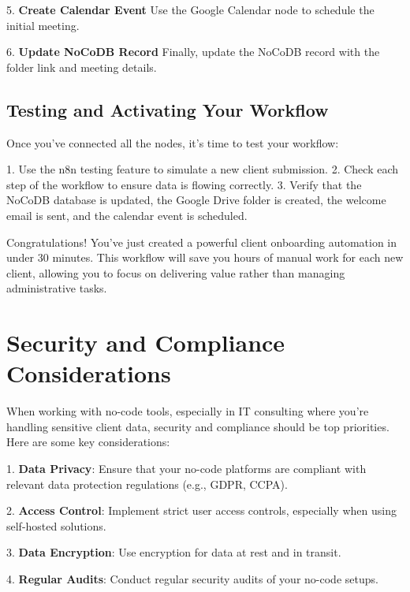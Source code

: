 5. \textbf{Create Calendar Event}
Use the Google Calendar node to schedule the initial meeting.


6. \textbf{Update NoCoDB Record}
Finally, update the NoCoDB record with the folder link and meeting details.


\subsection{Testing and Activating Your Workflow}

Once you've connected all the nodes, it's time to test your workflow:

1. Use the n8n testing feature to simulate a new client submission.
2. Check each step of the workflow to ensure data is flowing correctly.
3. Verify that the NoCoDB database is updated, the Google Drive folder is created, the welcome email is sent, and the calendar event is scheduled.


Congratulations! You've just created a powerful client onboarding automation in under 30 minutes. This workflow will save you hours of manual work for each new client, allowing you to focus on delivering value rather than managing administrative tasks.

\section{Security and Compliance Considerations}

When working with no-code tools, especially in IT consulting where you're handling sensitive client data, security and compliance should be top priorities. Here are some key considerations:

1. \textbf{Data Privacy}: Ensure that your no-code platforms are compliant with relevant data protection regulations (e.g., GDPR, CCPA).

2. \textbf{Access Control}: Implement strict user access controls, especially when using self-hosted solutions.

3. \textbf{Data Encryption}: Use encryption for data at rest and in transit.

4. \textbf{Regular Audits}: Conduct regular security audits of your no-code setups.

